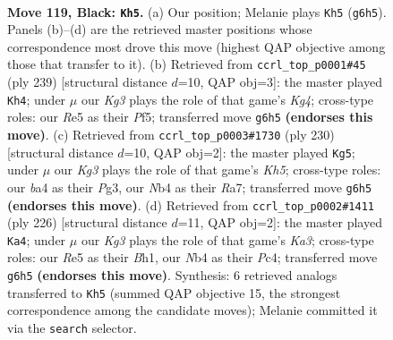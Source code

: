 \documentclass[11pt]{article}
\begin{document}
\clearpage

\begin{figure}[p]\centering
\begin{subfigure}{0.46\textwidth}\centering
\resizebox{\linewidth}{!}{%
\newchessgame
\chessboard[
  setfen={8/8/6k1/4r1p1/Bn6/6K1/8/8 b - - 23 119},
  showmover=false,
  pgfstyle=straightmove, color=movearrow, markmove={g6-h5}
]}
\caption{}
\end{subfigure}\hfill
\begin{subfigure}{0.46\textwidth}\centering
\resizebox{\linewidth}{!}{%
\newchessgame
\chessboard[
  setfen={8/8/8/4npk1/5p2/8/5K2/3B4 b - - 51 120},
  showmover=false,
  pgfstyle=straightmove, color=movearrow, markmove={g5-h4}
]}
\caption{}
\end{subfigure}
\\[4pt]
\begin{subfigure}{0.46\textwidth}\centering
\resizebox{\linewidth}{!}{%
\newchessgame
\chessboard[
  setfen={6k1/R7/6P1/7K/8/6P1/8/1r6 w - - 1 116},
  showmover=false,
  pgfstyle=straightmove, color=movearrow, markmove={h5-g5}
]}
\caption{}
\end{subfigure}\hfill
\begin{subfigure}{0.46\textwidth}\centering
\resizebox{\linewidth}{!}{%
\newchessgame
\chessboard[
  setfen={8/8/1k6/6b1/1PP5/K7/8/7B w - - 67 114},
  showmover=false,
  pgfstyle=straightmove, color=movearrow, markmove={a3-a4}
]}
\caption{}
\end{subfigure}
\caption{\textbf{Move 119, Black: \texttt{Kh5}.} (a) Our position; Melanie plays \texttt{Kh5} (\texttt{g6h5}). Panels (b)--(d) are the retrieved master positions whose correspondence most drove this move (highest QAP objective among those that transfer to it). (b) Retrieved from \texttt{ccrl\_top\_p0001\#45} (ply 239) [structural distance $d$=10, QAP obj=3]: the master played \texttt{Kh4}; under $\mu$ our \emph{Kg3} plays the role of that game's \emph{Kg4}; cross-type roles: our \emph{R}e5 as their \emph{P}f5; transferred move \texttt{g6h5} \textbf{(endorses this move)}. (c) Retrieved from \texttt{ccrl\_top\_p0003\#1730} (ply 230) [structural distance $d$=10, QAP obj=2]: the master played \texttt{Kg5}; under $\mu$ our \emph{Kg3} plays the role of that game's \emph{Kh5}; cross-type roles: our \emph{b}a4 as their \emph{P}g3, our \emph{N}b4 as their \emph{R}a7; transferred move \texttt{g6h5} \textbf{(endorses this move)}. (d) Retrieved from \texttt{ccrl\_top\_p0002\#1411} (ply 226) [structural distance $d$=11, QAP obj=2]: the master played \texttt{Ka4}; under $\mu$ our \emph{Kg3} plays the role of that game's \emph{Ka3}; cross-type roles: our \emph{R}e5 as their \emph{B}h1, our \emph{N}b4 as their \emph{P}c4; transferred move \texttt{g6h5} \textbf{(endorses this move)}. Synthesis: 6 retrieved analogs transferred to \texttt{Kh5} (summed QAP objective 15, the strongest correspondence among the candidate moves); Melanie committed it via the \texttt{search} selector.}
\label{fig:thought-m237}
\end{figure}
\end{document}
